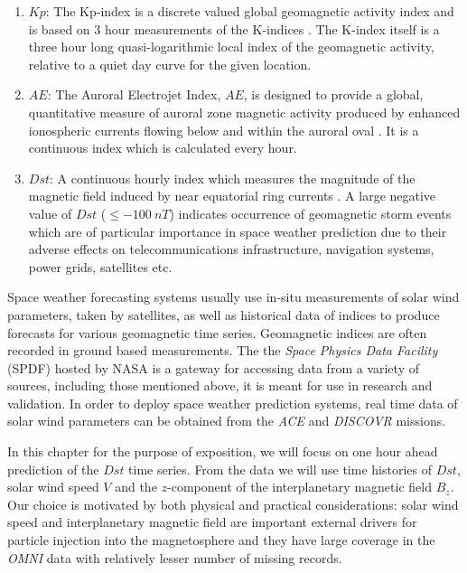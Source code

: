 \documentclass{article}
\begin{document}
\begin{enumerate}
\item $Kp$: The Kp-index is a discrete valued global geomagnetic
  activity index and is based on 3 hour measurements of the
  K-indices \citep{Bartels}. The K-index itself is a three hour
  long quasi-logarithmic local index of the geomagnetic activity,
  relative to a quiet day curve for the given location.
  
\item $AE$: The Auroral Electrojet Index, $AE$, is designed to
  provide a global, quantitative measure of auroral zone magnetic
  activity produced by enhanced ionospheric currents flowing below
  and within the auroral oval \citep{AEIndex}. It is a continuous
  index which is calculated every hour.
  
\item $Dst$: A continuous hourly index which measures the
  magnitude of the magnetic field induced by near equatorial ring
  currents \citep{DesslerAndParker}. A large negative value of
  $Dst$ ($ \leq -100 \ nT$) indicates occurrence of geomagnetic
  storm events which are of particular importance in space weather
  prediction due to their adverse effects on telecommunications
  infrastructure, navigation systems, power grids, satellites etc. 
\end{enumerate}

Space weather forecasting systems usually use in-situ measurements of
solar wind parameters, taken by satellites, as well as historical data
of indices to produce forecasts for various geomagnetic time
series. Geomagnetic indices are often recorded in
ground based measurements. The the \emph{Space Physics Data Facility}
(SPDF) hosted by NASA is a gateway for accessing data from a variety
of sources, including those mentioned above, it is meant for use in
research and validation. In order to deploy space weather prediction
systems, real time data of solar wind parameters can be obtained from
the \emph{ACE} and \emph{DISCOVR} missions.

In this chapter for the purpose of exposition, we will focus on one
hour ahead prediction of the $Dst$ time series. From the data we will
use time histories of $Dst$, solar wind speed $V$ and the
$z$-component of the interplanetary magnetic field $B_z$. Our choice
is motivated by both physical and practical considerations: solar wind
speed and interplanetary magnetic field are important external drivers
for particle injection into the magnetosphere and they have large
coverage in the \emph{OMNI} data with relatively lesser number of
missing records.
\end{document}

